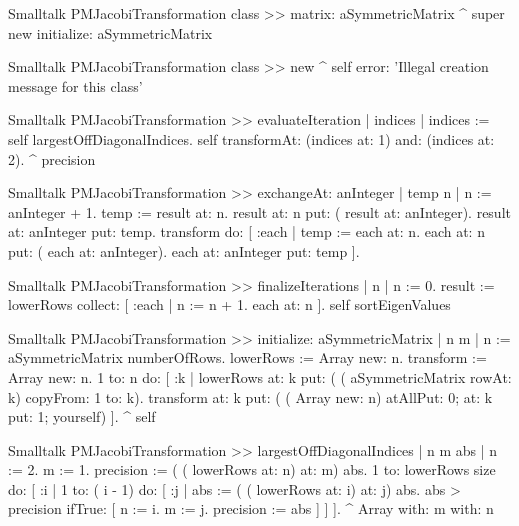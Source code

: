 \begin{displaycode}{Smalltalk}
PMJacobiTransformation class >> matrix: aSymmetricMatrix
    ^ super new initialize: aSymmetricMatrix
\end{displaycode}

\begin{displaycode}{Smalltalk}
PMJacobiTransformation class >> new
    ^ self error: 'Illegal creation message for this class'
\end{displaycode}

\begin{displaycode}{Smalltalk}
PMJacobiTransformation >> evaluateIteration
    | indices |
    indices := self largestOffDiagonalIndices.
    self transformAt: (indices at: 1) and: (indices at: 2).
    ^ precision
\end{displaycode}

\begin{displaycode}{Smalltalk}
PMJacobiTransformation >> exchangeAt: anInteger
    | temp n |
    n := anInteger + 1.
    temp := result at: n.
    result at: n put: ( result at: anInteger).
    result at: anInteger put: temp.
    transform do:
        [ :each |
          temp := each at: n.
          each at: n put: ( each at: anInteger).
          each at: anInteger put: temp ].
\end{displaycode}

\begin{displaycode}{Smalltalk}
PMJacobiTransformation >> finalizeIterations
    | n |
    n := 0.
    result := lowerRows collect: 
                    [ :each | 
                    n := n + 1.
                    each at: n ].
    self sortEigenValues
\end{displaycode}

\begin{displaycode}{Smalltalk}
PMJacobiTransformation >> initialize: aSymmetricMatrix
    | n m |
    n := aSymmetricMatrix numberOfRows.
    lowerRows := Array new: n.
    transform := Array new: n.
    1 to: n do:
        [ :k |
          lowerRows at: k put: ( ( aSymmetricMatrix rowAt: k) 
                                                   copyFrom: 1 to: k).
          transform at: k put: ( ( Array new: n) atAllPut: 0; at: k 
                                                    put: 1; yourself) ].
    ^ self
\end{displaycode}

\begin{displaycode}{Smalltalk}
PMJacobiTransformation >> largestOffDiagonalIndices
    | n m abs |
    n := 2.
    m := 1.
    precision := ( ( lowerRows at: n) at: m) abs.
    1 to: lowerRows size do:
        [ :i |
          1 to: ( i - 1) do:
            [ :j |
              abs := ( ( lowerRows at: i) at: j) abs.
              abs > precision
                ifTrue: [ n := i.
                          m := j.
                          precision := abs ] ] ].
    ^ Array with: m with: n
\end{displaycode}

